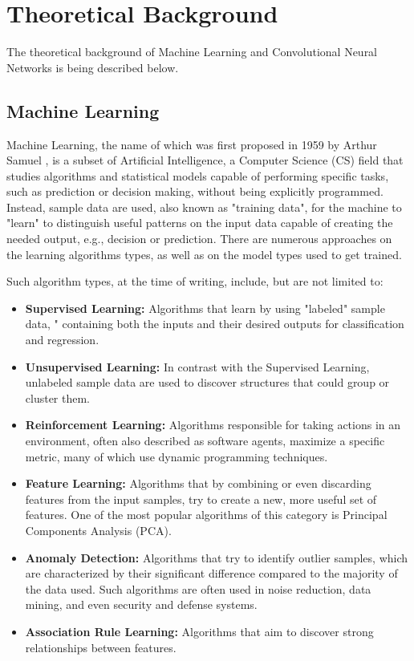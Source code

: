 \chapter{Theoretical Background}

\label{Chapter-Theoretical-Background}

The theoretical background of Machine Learning and Convolutional Neural Networks is being described below.

\section{Machine Learning}
Machine Learning, the name of which was first proposed in 1959 by Arthur Samuel \cite{Some-Studies-in-Machine-Learning-Using-the-Game-of-Checkers}, is a subset of Artificial Intelligence, a Computer Science (CS) field that studies algorithms and statistical models capable of performing specific tasks, such as prediction or decision making, without being explicitly programmed. Instead, sample data are used, also known as "training data", for the machine to "learn" to distinguish useful patterns on the input data capable of creating the needed output, e.g., decision or prediction. There are numerous approaches \cite{Machine-learning-Wikipedia} on the learning algorithms types, as well as on the model types used to get trained.

Such algorithm types, at the time of writing, include, but are not limited to:
\begin{itemize}
	\item \textbf{Supervised Learning:} Algorithms that learn by using "labeled" sample data, " containing both the inputs and their desired outputs for classification and regression.
	\item \textbf{Unsupervised Learning:} In contrast with the Supervised Learning, unlabeled sample data are used to discover structures that could group or cluster them.
	\item \textbf{Reinforcement Learning:} Algorithms responsible for taking actions in an environment, often also described as software agents, maximize a specific metric, many of which use dynamic programming techniques.
	\item \textbf{Feature Learning:} Algorithms that by combining or even discarding features from the input samples, try to create a new, more useful set of features. One of the most popular algorithms of this category is Principal Components Analysis (PCA).
	\item \textbf{Anomaly Detection:} Algorithms that try to identify outlier samples, which are characterized by their significant difference compared to the majority of the data used. Such algorithms are often used in noise reduction, data mining, and even security and defense systems.
	\item \textbf{Association Rule Learning:} Algorithms that aim to discover strong relationships between features.
\end{itemize}

